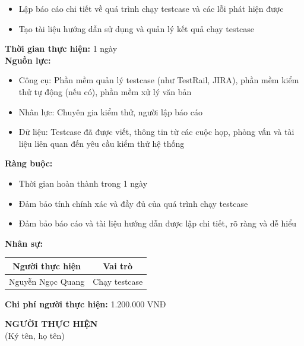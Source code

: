 {\begin{minipage}{\textwidth}
\begin{itemize}
        \item Lập báo cáo chi tiết về quá trình chạy testcase và các lỗi phát hiện được
        \item Tạo tài liệu hướng dẫn sử dụng và quản lý kết quả chạy testcase
    \end{itemize}
    \vspace{0.5cm}
    \noindent \textbf{Thời gian thực hiện:} 1 ngày \\
    \noindent \textbf{Nguồn lực:}
    \begin{itemize}
        \item Công cụ: Phần mềm quản lý testcase (như TestRail, JIRA), phần mềm kiểm thử tự động (nếu có), phần mềm xử lý văn bản
        \item Nhân lực: Chuyên gia kiểm thử, người lập báo cáo
        \item Dữ liệu: Testcase đã được viết, thông tin từ các cuộc họp, phỏng vấn và tài liệu liên quan đến yêu cầu kiểm thử hệ thống
    \end{itemize}
    \vspace{0.5cm}
    \noindent \textbf{Ràng buộc:}
    \begin{itemize}
        \item Thời gian hoàn thành trong 1 ngày
        \item Đảm bảo tính chính xác và đầy đủ của quá trình chạy testcase
        \item Đảm bảo báo cáo và tài liệu hướng dẫn được lập chi tiết, rõ ràng và dễ hiểu
    \end{itemize}
    \vspace{0.5cm}
    \noindent \textbf{Nhân sự:}
    \begin{longtable}{|c|c|}
    \hline
    \textbf{Người thực hiện} & \textbf{Vai trò} \\
    \hline
    Nguyễn Ngọc Quang & Chạy testcase \\
    \hline
    \end{longtable}
    \vspace{0.5cm}
    \noindent \textbf{Chi phí người thực hiện:} 1.200.000 VNĐ \\
    \vspace{1cm}
    \begin{flushleft}
        \hspace{8cm} \textbf{NGƯỜI THỰC HIỆN} \\
        \hspace{8.8cm} (Ký tên, họ tên) \\
        \vspace{1cm}
    \end{flushleft}
    \end{minipage}
}
% 
